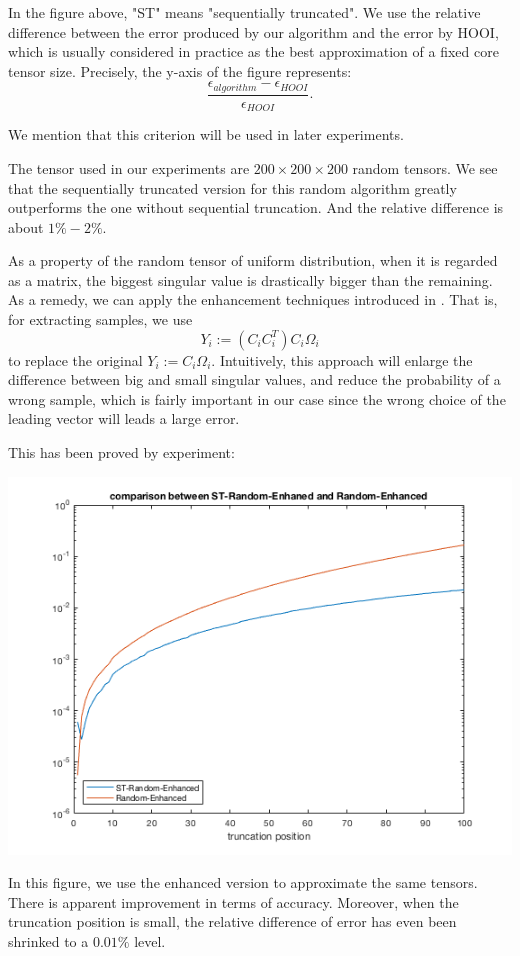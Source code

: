 \documentclass[12pt]{article}
\begin{document}
In the figure above, "ST" means "sequentially truncated". We use the relative difference between the error produced by our algorithm and the error by HOOI, which is usually considered in practice as the best approximation of a fixed core tensor size. Precisely, the y-axis of the figure represents:
$$ \frac{\epsilon_{algorithm} - \epsilon_{HOOI}}{\epsilon_{HOOI}}.$$

We mention that this criterion will be used in later experiments.

The tensor used in our experiments are $200 \times 200 \times 200$ random tensors. We see that the sequentially truncated version for this random algorithm greatly outperforms the one without sequential truncation. And the relative difference is about $1\%-2\%$.

As a property of the random tensor of uniform distribution, when it is regarded as a matrix, the biggest singular value is drastically bigger than the remaining. As a remedy, we can apply the enhancement techniques introduced in \cite{randAppro}. That is, for extracting samples, we use
$$ Y_i := (C_i C_i^T) C_i \Omega_i$$
to replace the original $Y_i :=  C_i \Omega_i$. Intuitively, this approach will enlarge the difference between big and small singular values, and reduce the probability of a wrong sample, which is fairly important in our case since the wrong choice of the leading vector will leads a large error.

This has been proved by experiment:

\centerline{\includegraphics[scale=0.7]{tensorRandomEnh}}

In this figure, we use the enhanced version to approximate the same tensors. There is apparent improvement in terms of accuracy. Moreover, when the truncation position is small, the relative difference of error has even been shrinked to a $0.01\%$ level.
\end{document}
